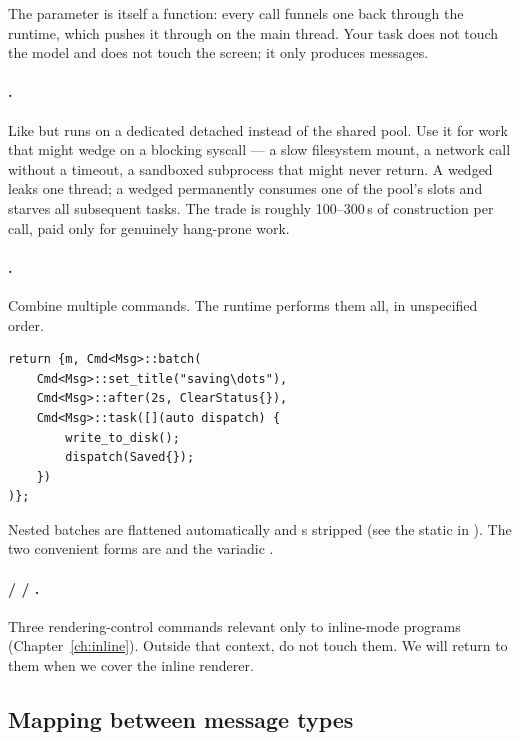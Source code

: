 The  parameter is itself a function: every call
funnels one  back through the runtime, which pushes it
through  on the main thread. Your task does not touch
the model and does not touch the screen; it only produces messages.

\paragraph{.} Like  but runs on a
dedicated detached  instead of the shared pool.
Use it for work that might wedge on a blocking syscall --- a slow
filesystem mount, a network call without a timeout, a sandboxed
subprocess that might never return. A wedged 
leaks one thread; a wedged  permanently consumes one of
the pool's slots and starves all subsequent tasks. The trade is
roughly 100--300\,\textmu{}s of  construction per
call, paid only for genuinely hang-prone work.

\paragraph{.} Combine multiple commands. The runtime
performs them all, in unspecified order.

\begin{lstlisting}
return {m, Cmd<Msg>::batch(
    Cmd<Msg>::set_title("saving\dots"),
    Cmd<Msg>::after(2s, ClearStatus{}),
    Cmd<Msg>::task([](auto dispatch) {
        write_to_disk();
        dispatch(Saved{});
    })
)};
\end{lstlisting}

Nested batches are flattened automatically and s stripped
(see the  static in ). The two convenient
forms are  and the variadic
.

\paragraph{ /  /
.} Three rendering-control commands relevant only
to inline-mode programs (Chapter~\ref{ch:inline}). Outside that
context, do not touch them. We will return to them when we cover
the inline renderer.

\subsection{Mapping  between message types}
\label{sec:elm:cmd-map}

